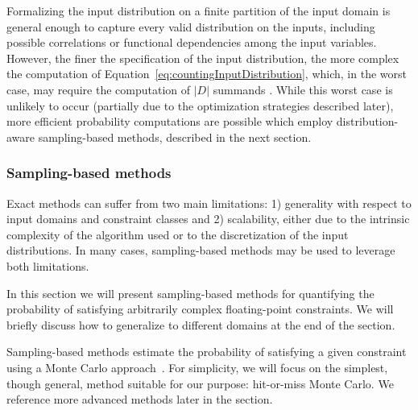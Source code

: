 Formalizing the input distribution on a finite partition of the input domain is general enough to capture every valid distribution on the inputs, including possible correlations or functional dependencies among the input variables. However, the finer the specification of the input distribution, the more complex the computation of Equation~\eqref{eq:countingInputDistribution}, which, in the worst case, may require the computation of $|D|$ summands \cite{Borges2014}. While this worst case is unlikely to occur (partially due to the optimization strategies described later), more efficient probability computations are possible which employ distribution-aware sampling-based methods, described in the next section.

\subsubsection{Sampling-based methods}\label{sec:computingprobabilitiesSampling}
Exact methods can suffer from two main limitations: 1) generality with respect to input domains and constraint classes and 2) scalability, either due to the intrinsic complexity of the algorithm used or to the discretization of the input distributions. In many cases, sampling-based methods may be used to leverage both limitations.

In this section we will present sampling-based methods for quantifying the probability of satisfying arbitrarily complex floating-point constraints. We will briefly discuss how to generalize to different domains at the end of the section.

Sampling-based methods estimate the probability of satisfying a given constraint using a Monte Carlo approach~\cite{robert2013monte}. For simplicity, we will focus on the simplest, though general, method suitable for our purpose: hit-or-miss Monte Carlo. We reference more advanced methods later in the section.


